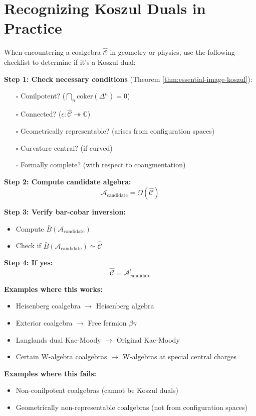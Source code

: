 
\section{Recognizing Koszul Duals in Practice}
\label{sec:recognizing-koszul-duals}

\begin{remark}\label{rem:identify-koszul-wild}
When encountering a coalgebra $\widehat{\mathcal{C}}$ in geometry or physics, use 
the following checklist to determine if it's a Koszul dual:

\textbf{Step 1: Check necessary conditions} (Theorem \ref{thm:essential-image-koszul}):
\begin{itemize}
\item[$\square$] Conilpotent? ($\bigcap_n \text{coker}(\Delta^n) = 0$)
\item[$\square$] Connected? ($\epsilon: \widehat{\mathcal{C}} \twoheadrightarrow \mathbb{C}$)
\item[$\square$] Geometrically representable? (arises from configuration spaces)
\item[$\square$] Curvature central? (if curved)
\item[$\square$] Formally complete? (with respect to coaugmentation)
\end{itemize}

\textbf{Step 2: Compute candidate algebra:}
$$\mathcal{A}_{\text{candidate}} = \Omega(\widehat{\mathcal{C}})$$

\textbf{Step 3: Verify bar-cobar inversion:}
\begin{itemize}
\item Compute $\bar{B}(\mathcal{A}_{\text{candidate}})$
\item Check if $\bar{B}(\mathcal{A}_{\text{candidate}}) \simeq \widehat{\mathcal{C}}$
\end{itemize}

\textbf{Step 4: If yes:}
$$\widehat{\mathcal{C}} = \mathcal{A}_{\text{candidate}}^!$$

\textbf{Examples where this works:}
\begin{itemize}
\item Heisenberg coalgebra $\to$ Heisenberg algebra
\item Exterior coalgebra $\to$ Free fermion $\beta\gamma$
\item Langlands dual Kac-Moody $\to$ Original Kac-Moody
\item Certain W-algebra coalgebras $\to$ W-algebras at special central charges
\end{itemize}

\textbf{Examples where this fails:}
\begin{itemize}
\item Non-conilpotent coalgebras (cannot be Koszul duals)
\item Geometrically non-representable coalgebras (not from configuration spaces)
\end{itemize}
\end{remark}

